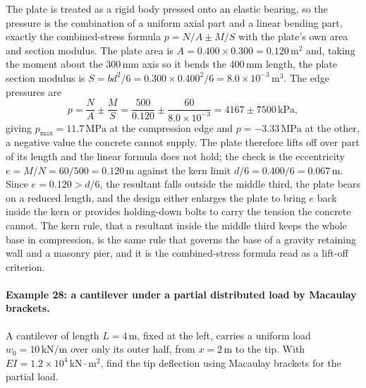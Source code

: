 The plate is treated as a rigid body pressed onto an elastic bearing,
so the pressure is the combination of a uniform axial part and a linear
bending part, exactly the combined-stress formula $p = N/A \pm M/S$ with
the plate's own area and section modulus. The plate area is $A = 0.400
\times 0.300 = 0.120\,\si{\meter\squared}$ and, taking the moment about
the $300\,\si{\milli\meter}$ axis so it bends the $400\,\si{\milli
\meter}$ length, the plate section modulus is $S = b d^2/6 = 0.300
\times 0.400^2/6 = 8.0 \times 10^{-3}\,\si{\meter\cubed}$. The edge
pressures are
\[
p = \frac{N}{A} \pm \frac{M}{S}
= \frac{500}{0.120} \pm \frac{60}{8.0 \times 10^{-3}}
= 4167 \pm 7500\,\text{kPa},
\]
giving $p_{\max} = 11.7\,\text{MPa}$ at the compression edge and $p =
-3.33\,\text{MPa}$ at the other, a negative value the concrete cannot
supply. The plate therefore lifts off over part of its length and the
linear formula does not hold; the check is the eccentricity $e = M/N =
60/500 = 0.120\,\si{\meter}$ against the kern limit $d/6 = 0.400/6 =
0.067\,\si{\meter}$. Since $e = 0.120 > d/6$, the resultant falls
outside the middle third, the plate bears on a reduced length, and the
design either enlarges the plate to bring $e$ back inside the kern or
provides holding-down bolts to carry the tension the concrete cannot.
The kern rule, that a resultant inside the middle third keeps the whole
base in compression, is the same rule that governs the base of a gravity
retaining wall and a masonry pier, and it is the combined-stress formula
read as a lift-off criterion.

\paragraph{Example 28: a cantilever under a partial distributed load by
Macaulay brackets.} A cantilever of length $L = 4\,\si{\meter}$, fixed
at the left, carries a uniform load $w_0 = 10\,\text{kN}/\text{m}$ over
only its outer half, from $x = 2\,\si{\meter}$ to the tip. With $EI =
1.2 \times 10^4\,\text{kN}\cdot\si{\meter\squared}$, find the tip
deflection using Macaulay brackets for the partial load.

